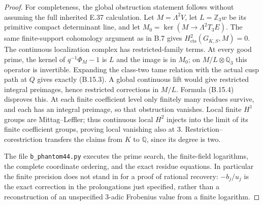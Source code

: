 \begin{proof}
For completeness, the global obstruction statement follows
without assuming the full inherited E.37 calculation. Let
$M=\Lambda^2V$, let $L=\mathbb Z_3w$ be its primitive compact
determinant line, and let
$M_0=\ker(M\to\Lambda^2T_3E)$. The same finite-support
cohomology argument as in B.7 gives
$H^2_{\mathrm{cts}}(G_{K,S},M)=0$. The continuous localization
complex has restricted-family terms. At every good prime,
the kernel of $q^{-1}\Phi_M-1$ is $L$ and the image is in
$M_0$; on $M/L\otimes\mathbb Q_3$ this operator is invertible.
Expanding the class-two tame relation with the actual cusp
path at $Q$ gives exactly (B.15.3). A global continuous lift
would give restricted integral preimages, hence restricted
corrections in $M/L$. Formula (B.15.4) disproves this.
At each finite coefficient level only finitely many residues
survive, and each has an integral preimage, so that obstruction
vanishes. Local finite $H^1$ groups are Mittag--Leffler; thus
continuous local $H^2$ injects into the limit of its finite
coefficient groups, proving local vanishing also at $3$.
Restriction--corestriction transfers the claims from $K$ to
$\mathbb Q$, since its degree is two.

The file \texttt{b\_phantom44.py} executes the prime search,
the finite-field logarithms, the complete coordinate ordering,
and the exact residue equations. In particular the finite
precision does not stand in for a proof of rational recovery:
$-b_j/u_j$ is the exact correction in the prolongations just
specified, rather than a reconstruction of an unspecified
$3$-adic Frobenius value from a finite logarithm.
\end{proof}

